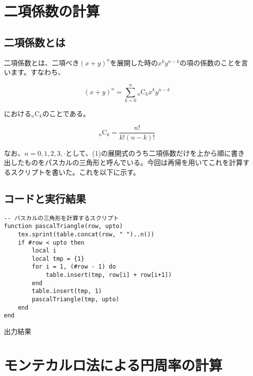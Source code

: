 \documentclass[a4paper]{article}
\begin{document}
	\section{二項係数の計算}
	\subsection{二項係数とは}
	二項係数とは、二項べき$(x + y)^{n}$を展開した時の$x^{k}y^{n-k}$の項の係数のことを言います。すなわち、

	\begin{equation}
		(x+y)^{n} = \sum_{k=0}^{n} {}_{n}\mathrm{C}_{k} x^{k}y^{n-k}
	\end{equation}

	における${}_n\mathrm{C}_{k}$のことである。

	\begin{equation}
		{}_{n}\mathrm{C}_{k} = \frac{n!}{k!(n-k)!}
	\end{equation}

	なお、$n = 0,1,2,3,\cdot$として、(1)の展開式のうち二項係数だけを上から順に書き出したものをパスカルの三角形と呼んでいる。今回は再帰を用いてこれを計算するスクリプトを書いた。これを以下に示す。

	\subsection{コードと実行結果}
	\begin{lstlisting}
-- パスカルの三角形を計算するスクリプト
function pascalTriangle(row, upto)
	tex.sprint(table.concat(row, " ")..n())
	if #row < upto then
		local i
		local tmp = {1}
		for i = 1, (#row - 1) do
			table.insert(tmp, row[i] + row[i+1])
		end 
		table.insert(tmp, 1)
		pascalTriangle(tmp, upto)
	end
end
	\end{lstlisting}

	\begin{itembox}[l]{出力結果}
		\centering
		{\scriptsize {}}
	\end{itembox}

	
	\section{モンテカルロ法による円周率の計算}
\end{document}
